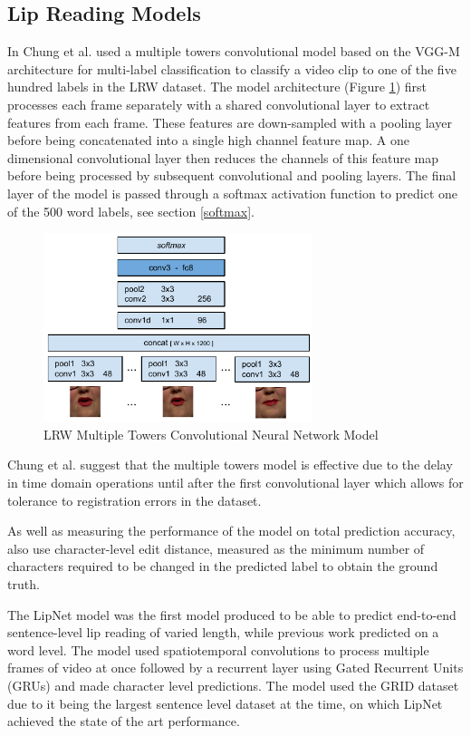 \subsection{Lip Reading Models}
In \cite{Chung2016} Chung et al. used a multiple towers convolutional model based on the VGG-M architecture for multi-label classification to classify a video clip to one of the five hundred labels in the LRW dataset.
The model architecture (Figure \ref{fig:LRW_Multiple_Towers}) first processes each frame separately with a shared convolutional layer to extract features from each frame.
These features are down-sampled with a pooling layer before being concatenated into a single high channel feature map.
A one dimensional convolutional layer then reduces the channels of this feature map before being processed by subsequent convolutional and pooling layers.
The final layer of the model is passed through a softmax activation function to predict one of the 500 word labels, see section \ref{softmax}.

\begin{figure}[h]
    \centering
        \includegraphics[width=0.7\textwidth]{figures/lrw_multiple_towers.png}
    \caption{LRW Multiple Towers Convolutional Neural Network Model \cite{Chung2016}}\label{fig:LRW_Multiple_Towers}
\end{figure}

Chung et al. suggest that the multiple towers model is effective due to the delay in time domain operations until after the first convolutional layer which allows for tolerance to registration errors in the dataset.

As well as measuring the performance of the model on total prediction accuracy, \cite{Chung2016} also use character-level edit distance, measured as the minimum number of characters required to be changed in the predicted label to obtain the ground truth.

The LipNet model \cite{Assael2016} was the first model produced to be able to predict end-to-end sentence-level lip reading of varied length, while previous work predicted on a word level.
The model used spatiotemporal convolutions to process multiple frames of video at once followed by a recurrent layer using Gated Recurrent Units (GRUs) \cite{Cho2014} and made character level predictions.
The model used the GRID dataset \cite{Cooke2006} due to it being the largest sentence level dataset at the time, on which LipNet achieved the state of the art performance.

